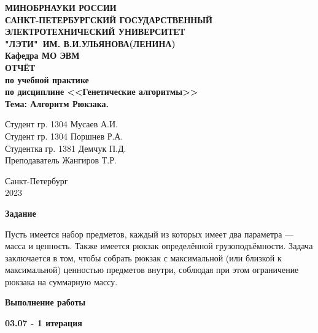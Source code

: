 \documentclass{article}
\date{\today}
\begin{document}
\thispagestyle{empty}
\begin{center}
    \LARGE\textbf{МИНОБРНАУКИ РОССИИ\\
        САНКТ-ПЕТЕРБУРГСКИЙ ГОСУДАРСТВЕННЫЙ\\
        ЭЛЕКТРОТЕХНИЧЕСКИЙ УНИВЕРСИТЕТ\\
        "ЛЭТИ"\ ИМ. В.И.УЛЬЯНОВА(ЛЕНИНА)\\
        Кафедра МО ЭВМ}\\[4cm]
    \Large\textbf{ОТЧЁТ}\\[0.2cm]
    \Large\textbf{по учебной практике}\\[0.1cm]
    \Large\textbf{по дисциплине <<Генетические алгоритмы>>}\\[0.1cm]
    \Large\textbf{Тема: Алгоритм Рюкзака.}\\[2cm]
\end{center}
\Large{Студент гр. 1304 \qquad \qquad \quad \underline{\hspace{6cm}} \qquad \qquad Мусаев А.И.}\\[0.25cm]
\Large{Студент гр. 1304 \qquad \qquad \quad \underline{\hspace{6cm}} \qquad \qquad Поршнев Р.А.}\\[0.25cm]
\Large{Студентка гр. 1381 \qquad \quad \quad \underline{\hspace{6cm}} \qquad \qquad Демчук П.Д.}\\[0.25cm]
\Large{Преподаватель \qquad \qquad \qquad \underline{\hspace{6cm}} \qquad \qquad Жангиров Т.Р.}\\[1cm]
\begin{center}
    Санкт-Петербург\\
    2023
\end{center}
\newpage

\textbf{Задание}

Пусть имеется набор предметов, каждый из которых имеет два параметра — масса и ценность. Также имеется рюкзак определённой грузоподъёмности. Задача заключается в том, чтобы собрать рюкзак с максимальной (или близкой к максимальной) ценностью предметов внутри, соблюдая при этом ограничение рюкзака на суммарную массу.

\textbf{Выполнение работы}

\textbf{03.07 - 1 итерация}
\end{document}
